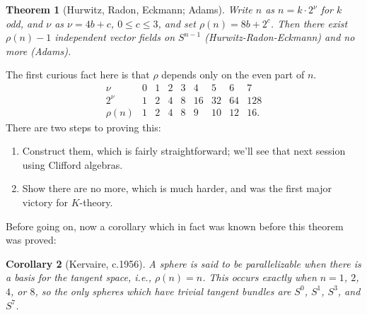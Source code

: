 \documentclass{article}
\newtheorem{thm}{Theorem}[section]
\newtheorem{cor}[thm]{Corollary}
\begin{document}
\begin{thm}[Hurwitz, Radon, Eckmann; Adams]
Write $n$ as $n = k \cdot 2^\nu$ for $k$ odd, and $\nu$ as $\nu = 4b + c$, $0 \le c \le 3$, and set $\rho(n) = 8b + 2^c$.  Then there exist $\rho(n) - 1$ independent vector fields on $S^{n-1}$ (Hurwitz-Radon-Eckmann) and no more (Adams).
\end{thm}
The first curious fact here is that $\rho$ depends only on the even part of $n$.
\[\begin{array}{c|cccccccc}
\nu & 0 & 1 & 2 & 3 & 4 & 5 & 6 & 7 \\
2^\nu & 1 & 2 & 4 & 8 & 16 & 32 & 64 & 128 \\
\hline
\rho(n) & 1 & 2 & 4 & 8 & 9 & 10 & 12 & 16.
\end{array}\]
There are two steps to proving this:
\begin{enumerate} %
\item Construct them, which is fairly straightforward; we'll see that next session using Clifford algebras.
\item Show there are no more, which is much harder, and was the first major victory for $K$-theory.
\end{enumerate}
Before going on, now a corollary which in fact was known before this theorem was proved:
\begin{cor}[Kervaire, c.1956]
A sphere is said to be parallelizable when there is a basis for the tangent space, i.e., $\rho(n) = n$.  This occurs exactly when $n = 1$, $2$, $4$, or $8$, so the only spheres which have trivial tangent bundles are $S^0$, $S^1$, $S^3$, and $S^7$.
\end{cor}
\end{document}
